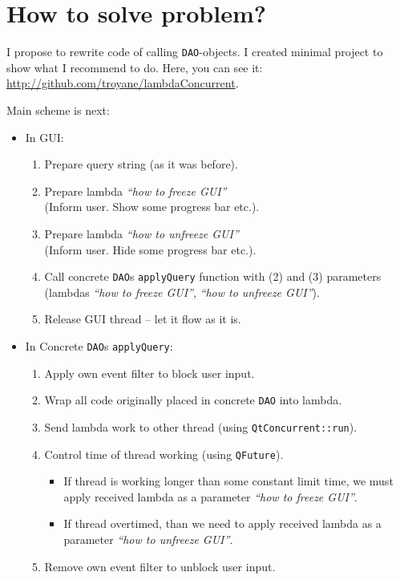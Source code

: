 \documentclass[a4paper,12pt]{scrartcl}
\begin{document}
\section{How to solve problem?}
I propose to rewrite code of calling \texttt{DAO}-objects. I created minimal project to show what I recommend to do. Here, you can see it: \url{http://github.com/troyane/lambdaConcurrent}.

Main scheme is next:
\begin{itemize}
 \item In GUI:
 \begin{enumerate}
  \item Prepare query string (as it was before).
  \item Prepare lambda \textit{``how to freeze GUI''} \\(Inform user. Show some progress bar etc.).
  \item Prepare lambda \textit{``how to unfreeze GUI''} \\(Inform user. Hide some progress bar etc.).
  \item Call concrete \texttt{DAO}s \texttt{applyQuery} function with (2) and (3) parameters (lambdas \textit{``how to freeze GUI''}, \textit{``how to unfreeze GUI''}).
  \item Release GUI thread -- let it flow as it is.
 \end{enumerate}
 \item In Concrete \texttt{DAO}s \texttt{applyQuery}:
 \begin{enumerate}
  \item Apply own event filter to block user input.
  \item Wrap all code originally placed in concrete \texttt{DAO} into lambda.
  \item Send lambda work to other thread (using \texttt{QtConcurrent::run}).
  \item Control time of thread working (using \texttt{QFuture}).
  \begin{itemize}
   \item If thread is working longer than some constant limit time, we must apply received lambda as a parameter \textit{``how to freeze GUI''}.
   \item If thread overtimed, than we need to apply received lambda as a parameter \textit{``how to unfreeze GUI''}.
  \end{itemize}
  \item Remove own event filter to unblock user input.
 \end{enumerate}
\end{itemize}
\end{document}
